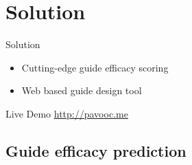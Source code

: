 \documentclass[Nike]{tuberlinbeamer}
\begin{document}
\section{Solution}


\begin{frame}{Solution}
  \begin{itemize}
    \vspace{0.2cm}
    \item Cutting-edge guide efficacy scoring
      \pause
    \vspace{0.2cm}
    \item Web based guide design tool
  \end{itemize}
\end{frame}

\begin{frame}{Live Demo}
  \url{http://pavooc.me}
\end{frame}

\subsection{Guide efficacy prediction}
\end{document}
